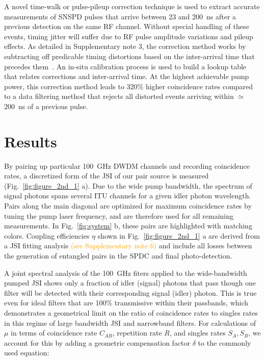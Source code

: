 \documentclass[11pt]{caltech_thesis} %
\begin{document}
A novel time-walk or pulse-pileup correction technique is used to extract accurate measurements of SNSPD pulses that arrive between 23 and 200~ns after a previous detection on the same RF channel. Without special handling of these events, timing jitter will suffer due to RF pulse amplitude variations and pileup effects. As detailed in Supplementary note 3, the correction method works by subtracting off predicable timing distortions based on the inter-arrival time that precedes them~\autocite{Mueller2023,Craiciu23}. An in-situ calibration process is used to build a lookup table that relates corrections and inter-arrival time. At the highest achievable pump power, this correction method leads to 320\% higher coincidence rates compared to a data filtering method that rejects all distorted events arriving within $\simeq$ 200~ns of a previous pulse.

\hypertarget{results-1}{%
\section{Results}\label{results-1}}

By pairing up particular 100~GHz DWDM channels and recording coincidence rates, a discretized form of the JSI of our pair source is measured (Fig.~\ref{fig:figure_2nd_1} a). Due to the wide pump bandwidth, the spectrum of signal photons spans several ITU channels for a given idler photon wavelength. Pairs along the main diagonal are optimized for maximum coincidence rates by tuning the pump laser frequency, and are therefore used for all remaining measurements. In Fig.~\ref{fig:system} b, these pairs are highlighted with matching colors. Coupling efficiencies $\eta$ shown in Fig.~\ref{fig:figure_2nd_1} a are derived from a JSI fitting analysis \textcolor{orange}{(see Supplementary note 6)} and include all losses between the generation of entangled pairs in the SPDC and final photo-detection.

A joint spectral analysis of the 100~GHz fiters applied to the wide-bandwidth pumped JSI shows only a fraction of idler (signal) photons that pass though one filter will be detected with their corresponding signal (idler) photon. This is true even for ideal filters that are 100\% transmissive within their passbands, which demonstrates a geometrical limit on the ratio of coincidence rates to singles rates in this regime of large bandwidth JSI and narrowband filters. For calculations of $\mu$ in terms of coincidence rate $C_{AB}$, repetition rate $R$, and singles rates $S_A, S_B$, we account for this by adding a geometric compensation factor $\delta$ to the commonly used equation:
\end{document}
